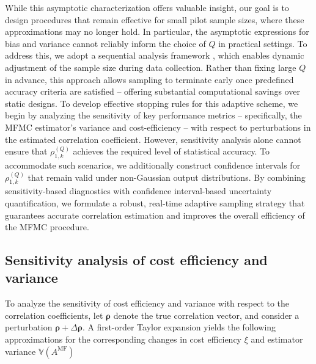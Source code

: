 While this asymptotic characterization offers valuable insight, our goal is to design procedures that remain effective for small pilot sample sizes, where these approximations may no longer hold. In particular, the asymptotic expressions for bias and variance cannot reliably inform the choice of $Q$ in practical settings. To address this, we adopt a sequential analysis framework \cite{La:2001,Wa:1947}, which enables dynamic adjustment of the sample size during data collection. Rather than fixing large $Q$ in advance, this approach allows sampling to terminate early once predefined accuracy criteria are satisfied -- offering substantial computational savings over static designs. To develop effective stopping rules for this adaptive scheme, we begin by analyzing the sensitivity of key performance metrics -- specifically, the MFMC estimator’s variance and cost-efficiency -- with respect to perturbations in the estimated correlation coefficient. However, sensitivity analysis alone cannot ensure that $\rho_{1,k}^{(Q)}$ achieves the required level of statistical accuracy.  To accommodate such scenarios, we additionally construct confidence intervals for $\rho_{1,k}^{(Q)}$ that remain valid under non-Gaussian output distributions. By combining sensitivity-based diagnostics with confidence interval-based uncertainty quantification, we formulate a robust, real-time adaptive sampling strategy that guarantees accurate correlation estimation and improves the overall efficiency of the MFMC procedure.





\subsection{Sensitivity analysis of cost efficiency and variance}
To analyze the sensitivity of cost efficiency and variance with respect to the correlation coefficients, let $\boldsymbol{\rho}$ denote the true correlation vector, and consider a perturbation $\boldsymbol{\rho} + \Delta \boldsymbol{\rho}$. A first-order Taylor expansion yields the following approximations for the corresponding changes in cost efficiency $\xi$ and estimator variance $\mathbb{V}(A^{\text{MF}})$


